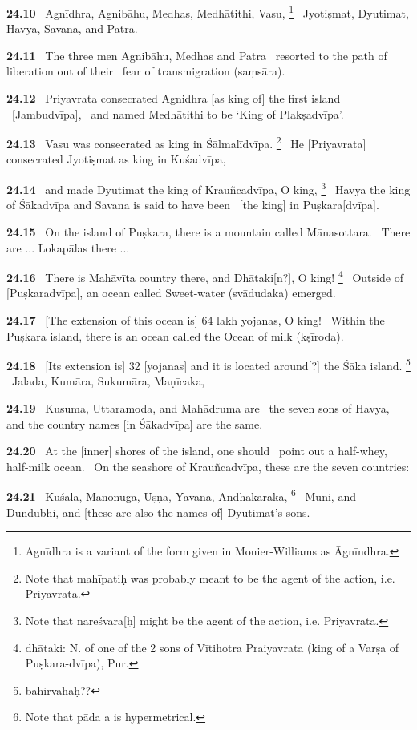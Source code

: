 \documentclass{article}
\begin{document}
\textbf{24.10}%
\ Agnīdhra, Agnibāhu, Medhas, Medhātithi, Vasu,%
\footnote{Agnīdhra is a variant of the form given in Monier-Williams as Āgnīndhra. }%
\ Jyotiṣmat, Dyutimat, Havya, Savana, and Patra.%


\textbf{24.11}%
\ The three men Agnibāhu, Medhas and Patra%
\ resorted to the path of liberation out of their%
\              fear of transmigration (saṃsāra).%


\textbf{24.12}%
\ Priyavrata consecrated Agnidhra [as king of] the first island%
\              [Jambudvīpa],%
\ and named Medhātithi to be `King of Plakṣadvīpa'.%


\textbf{24.13}%
\ Vasu was consecrated as king in Śālmalīdvīpa.%
\footnote{Note that mahīpatiḥ was probably meant to be the agent of the action, i.e. Priyavrata. }%
\ He [Priyavrata] consecrated Jyotiṣmat as king in Kuśadvīpa,%


\textbf{24.14}%
\ and made Dyutimat the king of Krauñcadvīpa, O king,%
\footnote{Note that nareśvara[ḥ] might be the agent of the action, i.e. Priyavrata. }%
\ Havya the king of Śākadvīpa and Savana is said to have been%
\                                 [the king] in Puṣkara[dvīpa].%


\textbf{24.15}%
\ On the island of Puṣkara, there is a mountain called Mānasottara.%
\ There are ... Lokapālas there ...%


\textbf{24.16}%
\ There is Mahāvīta country there, and Dhātaki[n?], O king!%
\footnote{dhātaki: N. of one of the 2 sons of Vītihotra Praiyavrata (king of a Varṣa of Puṣkara-dvīpa), Pur. }%
\ Outside of [Puṣkaradvīpa], an ocean called Sweet-water (svādudaka) emerged.%


\textbf{24.17}%
\ [The extension of this ocean is] 64 lakh yojanas, O king!%
\ Within the Puṣkara island, there is an ocean called the Ocean of milk (kṣīroda).%


\textbf{24.18}%
\ [Its extension is] 32 [yojanas] and it is located around[?] the Śāka island.%
\footnote{bahirvahaḥ??  }%
\ Jalada, Kumāra, Sukumāra, Maṇīcaka,%


\textbf{24.19}%
\ Kusuma, Uttaramoda, and Mahādruma are%
\ the seven sons of Havya, and the country names [in Śākadvīpa] are the same.%


\textbf{24.20}%
\ At the [inner] shores of the island, one should%
\                         point out a half-whey, half-milk ocean.%
\ On the seashore of Krauñcadvīpa, these are the seven countries:%


\textbf{24.21}%
\ Kuśala, Manonuga, Uṣṇa, Yāvana, Andhakāraka,%
\footnote{Note that pāda a is hypermetrical. }%
\ Muni, and Dundubhi, and [these are also the names of] Dyutimat's sons.%
\end{document}
